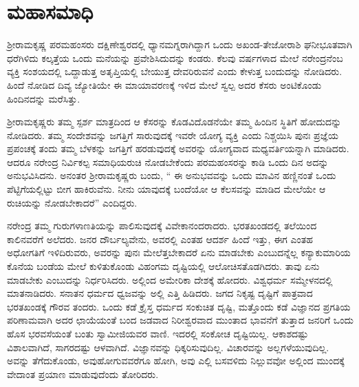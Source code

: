 
\chapter{ಮಹಾಸಮಾಧಿ }

\vskip 2pt

 ಶ‍್ರೀರಾಮಕೃಷ್ಣ ಪರಮಹಂಸರು ದಕ್ಷಿಣೇಶ್ವರದಲ್ಲಿ ಧ್ಯಾನಮಗ್ನರಾಗಿದ್ದಾಗ ಒಂದು ಅಖಂಡ-ತೇಜೋರಾಶಿ ಘನೀಭೂತವಾಗಿ ಧರೆಗಿಳಿದು ಕಲ್ಕತ್ತೆಯ ಒಂದು ಮನೆಯನ್ನು ಪ್ರವೇಶಿಸಿದುದನ್ನು ಕಂಡರು. ಕೆಲವು ವರ್ಷಗಳಾದ ಮೇಲೆ ನರೇಂದ್ರನೆಂಬ ವ್ಯಕ್ತಿ ಸಂಶಯದಲ್ಲಿ ಒದ್ದಾಡುತ್ತ ಅತೃಪ್ತಿಯಲ್ಲಿ ಬೇಯುತ್ತ ದೇವರಿರುವನೆ ಎಂದು ಕೇಳುತ್ತ ಬಂದುದನ್ನು ನೋಡಿದರು. ಹಿಂದೆ ನೋಡಿದ ದಿವ್ಯ ಜ್ಯೋತಿಯೇ ಈ ಮಾಯಾವರಣಕ್ಕೆ ಇಳಿದ ಮೇಲೆ ಸ್ವಲ್ಪ ಅದರ ಕೆಸರು ಅಂಟಿಕೊಂಡು ಹಿಂದಿನದನ್ನು ಮರೆಸಿತ್ತು. 

\vskip 2pt

 ಶ‍್ರೀರಾಮಕೃಷ್ಣರು ತಮ್ಮ ಸ್ಪರ್ಶ ಮಾತ್ರದಿಂದ ಆ ಕೆಸರನ್ನು ಕೊಡವಿದೊಡನೆಯೇ ತಮ್ಮ ಹಿಂದಿನ ಸ್ಥಿತಿಗೆ ಹೋದುದನ್ನು ನೋಡಿದರು. ತಮ್ಮ ಸಂದೇಶವನ್ನು ಜಗತ್ತಿಗೆ ಸಾರುವುದಕ್ಕೆ ಇವರೇ ಯೋಗ್ಯ ವ್ಯಕ್ತಿ ಎಂದು ನಿಶ್ಚಯಿಸಿ ಪುನಃ ಪ್ರಜ್ಞೆಯ ಪ್ರಪಂಚಕ್ಕೆ ತಂದು ತಮ್ಮ ಬೆಳಕನ್ನು ಜಗತ್ತಿಗೆ ಹರಡುವುದಕ್ಕೆ ಅವರನ್ನು ಯೋಗ್ಯವಾದ ಮಧ್ಯವರ್ತಿಯನ್ನಾಗಿ ಮಾಡಿದರು. ಆದರೂ ನರೇಂದ್ರ ನಿರ್ವಿಕಲ್ಪ ಸಮಾಧಿಯರುಚಿ ನೋಡಬೇಕೆಂದು ಪರಮಹಂಸರನ್ನು ಕಾಡಿ ಒಂದು ದಿನ ಅದನ್ನು ಅನುಭವಿಸಿದನು. ಅನಂತರ ಶ‍್ರೀರಾಮಕೃಷ್ಣರು ಬಂದು, “ ಈ ಅನುಭವವನ್ನು ಒಂದು ಮಾವಿನ ಹಣ್ಣಿನಂತೆ ಒಂದು ಪೆಟ್ಟಿಗೆಯಲ್ಲಿಟ್ಟು ಬೀಗ ಹಾಕಿರುವೆನು. ನೀನು ಯಾವುದಕ್ಕೆ ಬಂದೆಯೋ ಆ ಕೆಲಸವನ್ನು ಮಾಡಿದ ಮೇಲೆಯೇ ಆ ರುಚಿಯನ್ನು ನೋಡಬೇಕಾದರೆ” ಎಂದಿದ್ದರು. 

\vskip 2pt

 ನರೇಂದ್ರ ತಮ್ಮ ಗುರುಗಳಾಣತಿಯನ್ನು ಪಾಲಿಸುವುದಕ್ಕೆ ವಿವೇಕಾನಂದರಾದರು. ಭರತಖಂಡದಲ್ಲಿ ತಲೆಯಿಂದ ಕಾಲಿನವರೆಗೆ ಅಲೆದರು. ಜನರ ದೌರ್ಬಲ್ಯವೇನು, ಅವರಲ್ಲಿ ಎಂತಹ ಆದರ್ಶ ಹಿಂದೆ ಇತ್ತು, ಈಗ ಎಂತಹ ಅಧೋಗತಿಗೆ ಇಳಿದಿರುವರು, ಅವರನ್ನು ಪುನಃ ಮೇಲೆತ್ತಬೇಕಾದರೆ ಏನು ಮಾಡಬೇಕು ಎಂಬುದನ್ನೆಲ್ಲ ಕನ್ಯಾಕುಮಾರಿಯ ಕೊನೆಯ ಬಂಡೆಯ ಮೇಲೆ ಕುಳಿತುಕೊಂಡು ವಿಹಂಗಮ ದೃಷ್ಟಿಯಲ್ಲಿ ಆಲೋಚಿಸತೊಡಗಿದರು. ತಾವು ಏನು ಮಾಡಬೇಕು ಎಂಬುದನ್ನು ನಿರ್ಧರಿಸಿದರು. ಅಲ್ಲಿಂದ ಅಮೇರಿಕಾ ದೇಶಕ್ಕೆ ಹೋದರು. ವಿಶ್ವಧರ್ಮ ಸಮ್ಮೇಳನದಲ್ಲಿ ಮಾತನಾಡಿದರು. ಸನಾತನ ಧರ್ಮದ ಧ್ವಜವನ್ನು ಅಲ್ಲಿ ಎತ್ತಿ ಹಿಡಿದರು. ಜಗದ ನಿಕೃಷ್ಟ ದೃಷ್ಟಿಗೆ ಪಾತ್ರವಾದ ಭರತಖಂಡಕ್ಕೆ ಗೌರವ ತಂದರು. ಒಂದು ಕಡೆ ಕ್ರೈಸ್ತ ಧರ್ಮದ ಸಂಕುಚಿತ ದೃಷ್ಟಿ, ಮತ್ತೊಂದು ಕಡೆ ವಿಜ್ಞಾನದ ಪ್ರಗತಿಯ ಪರಿಣಾಮವಾಗಿ ಅದರ ಛಾಯೆಯಂತೆ ಬಂದ ಜಡವಾದ ನಿರೀಶ್ವರವಾದ ಮುಂತಾದ ಭಾವನೆಗೆ ತುತ್ತಾದ ಜನರಿಗೆ ಒಂದು ಹೊಸ ಭರವಸೆಯಂತೆ ಬಂತು ಸ್ವಾಮೀಜಿಯವರ ವಾಣಿ. ಇದರಲ್ಲಿ ಸಂಕೋಚ ದೃಷ್ಟಿಯಿಲ್ಲ. ಆಕಾಶದಷ್ಟು ವಿಶಾಲವಾಗಿದೆ, ಸಾಗರದಷ್ಟು ಆಳವಾಗಿದೆ. ವಿಜ್ಞಾನವನ್ನು ಧಿಕ್ಕರಿಸುವುದಿಲ್ಲ. ವಿಚಾರವನ್ನು ಅಲ್ಲಗಳೆಯುವುದಿಲ್ಲ. ಅವನ್ನು ತೆಗೆದುಕೊಂಡು, ಅವು\break ಹೋಗುವವರೆಗೂ ಹೋಗಿ, ಅವು ಎಲ್ಲಿ ಬಸವಳಿದು ನಿಲ್ಲುವವೋ ಅಲ್ಲಿಂದ ಮುಂದಕ್ಕೆ ವೇದಾಂತ ಪ್ರಯಾಣ ಮಾಡುವುದೆಂದು ತೋರಿದರು. 

